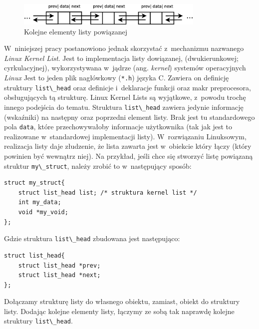 \documentclass[a4paper,12pt,polish,oneside]{thesis}
\newcommand\code[1]{\lstinline[style=line]{#1}}
\begin{document}
\begin{figure}[htb]
	\begin{center}
		\includegraphics[width=0.80\textwidth]{linkedlist.eps}
		\caption{Kolejne elementy listy powiązanej}
	\end{center}
\end{figure}


W~niniejszej pracy postanowiono jednak skorzystać z~mechanizmu nazwanego \emph{Linux Kernel List}.
Jest to implementacja listy dowiązanej, (dwukierunkowej; cyrkulacyjnej), wykorzystywana w~jądrze (ang. \emph{kernel}) systemów operacyjnych \emph{Linux}
Jest to jeden plik nagłówkowy (\code{*.h}) języka C.
Zawiera on definicję struktury \code{list\_head} oraz definicje i~deklaracje funkcji oraz makr preprocesora, obsługujących tą strukturę.
Linux Kernel Lists są wyjątkowe, z~powodu trochę innego podejścia do tematu.
Struktura \code{list\_head} zawiera jedynie informację (wskaźniki) na następny oraz poprzedni element listy.
Brak jest tu standardowego pola \code{data}, które przechowywałoby informacje użytkownika (tak jak jest to realizowane w~standardowej implementacji listy).
W~rozwiązaniu Linuksowym, realizacja listy daje złudzenie, że lista zawarta jest w~obiekcie który łączy (który powinien być wewnątrz niej).
Na przykład, jeśli chce się stworzyć listę powiązaną struktur \code{my\_struct}, należy zrobić to w~następujący sposób:
\begin{lstlisting}[style=code,caption=Przykład tworzenia listy powiązanej za pomocą Kernel Lined List]
struct my_struct{
	struct list_head list; /* struktura kernel list */
	int my_data;
	void *my_void;
};
\end{lstlisting}
Gdzie struktura \code{list\_head} zbudowana jest następująco:
\begin{lstlisting}[style=code]
struct list_head{
	struct list_head *prev;
	struct list_head *next;
};
\end{lstlisting}
Dołączamy strukturę listy do własnego obiektu, zamiast, obiekt do struktury listy.
Dodając kolejne elementy listy, łączymy ze sobą tak naprawdę kolejne struktury \code{list\_head}.
\end{document}
